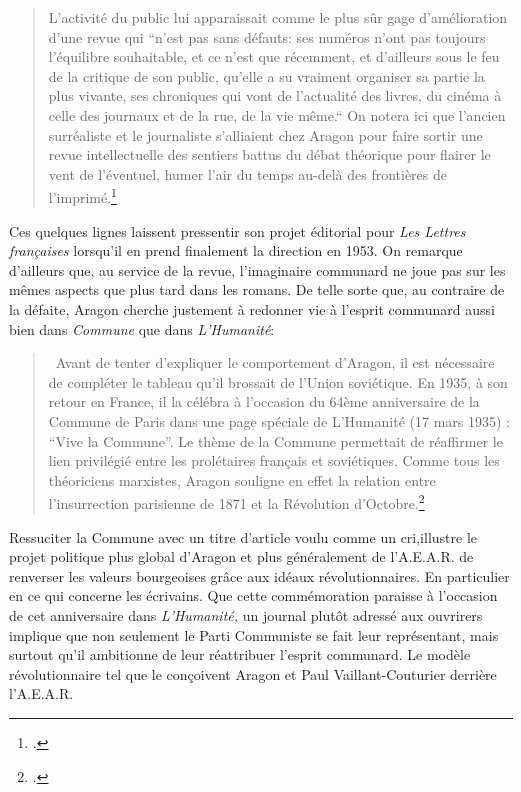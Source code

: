 \begin{quote}
 L’activité du public lui apparaissait comme le plus sûr gage d’amélioration d’une revue qui “n’est pas sans défauts: ses numéros n’ont pas toujours l’équilibre souhaitable, et ce n’est que récemment,  et d’ailleurs sous le feu de la critique de son public, qu’elle a su vraiment organiser sa partie la plus vivante, ses chroniques qui vont de l'actualité des livres, du cinéma à celle des journaux et de la rue, de la vie même.“ On notera ici que l’ancien surréaliste et le journaliste s’alliaient chez Aragon pour faire sortir une revue intellectuelle des sentiers battus du débat théorique pour flairer le vent de l’éventuel, humer l’air du temps au-delà des frontières de l’imprimé.\footcite[p205]{lavoinne}\end{quote}

Ces quelques lignes laissent pressentir son projet éditorial pour \emph{Les Lettres françaises} lorsqu'il en prend finalement la direction en 1953. On remarque d'ailleurs que, au service de la revue, l'imaginaire communard ne joue pas sur les mêmes aspects que plus tard dans les romans. De telle sorte que, au contraire de la défaite, Aragon cherche justement à redonner vie à l'esprit communard aussi bien dans \emph{Commune} que dans \emph{L'Humanité}:  

\begin{quote}
 Avant de tenter d’expliquer le comportement d’Aragon, il est nécessaire de compléter le tableau qu’il brossait de l’Union soviétique. En 1935, à son retour en France, il la célébra à l’occasion du 64ème anniversaire de la Commune de Paris dans une page spéciale de L’Humanité (17 mars 1935) : \enquote{Vive la Commune}. 
Le thème de la Commune permettait de réaffirmer le lien privilégié entre les prolétaires français et soviétiques. Comme tous les théoriciens marxistes, Aragon souligne en effet la relation entre l’insurrection parisienne de 1871 et la Révolution d’Octobre.\footcite[p133]{lavoinne}
\end{quote}

Ressuciter la Commune avec un titre d'article voulu comme un cri,illustre le projet politique plus global d'Aragon et plus généralement de l'A.E.A.R. de renverser les valeurs bourgeoises grâce aux idéaux révolutionnaires. En particulier en ce qui concerne les écrivains. Que cette commémoration paraisse à l'occasion de cet anniversaire dans \emph{L'Humanité,} un journal plutôt adressé aux ouvrirers implique  que non seulement le Parti Communiste se fait leur représentant, mais surtout qu'il ambitionne de leur réattribuer l'esprit communard. Le modèle révolutionnaire tel que le conçoivent Aragon et Paul Vaillant-Couturier derrière l'A.E.A.R. 

